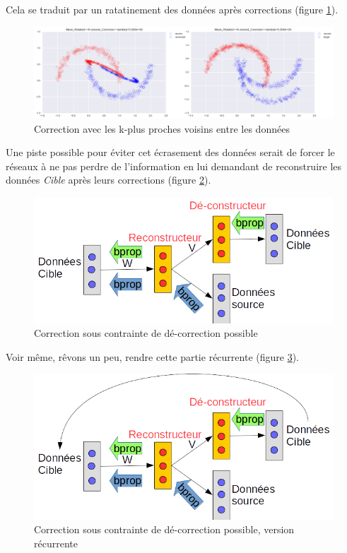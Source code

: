 Cela se traduit par un ratatinement des données après corrections (figure \ref{fig:exhaustive-pb}).

\begin{figure}[H] %
\centering
\includegraphics[width=\linewidth]{fig/21-04-2016/exhaustive-pb.png}
\caption{Correction avec les k-plus proches voisins entre les données}
\label{fig:exhaustive-pb}
\end{figure}

Une piste possible pour éviter cet écrasement des données serait de forcer le 
réseaux à ne pas perdre de l'information en lui demandant de reconstruire les
données \emph{Cible} après leurs corrections (figure \ref{fig:de-correcteur}).

\begin{figure}[H] %
\centering
\includegraphics[width=0.45\linewidth]{fig/21-04-2016/Re-De-constructeur.png}
\caption{Correction sous contrainte de dé-correction possible}
\label{fig:de-correcteur}
\end{figure}

Voir même, rêvons un peu, rendre cette partie récurrente (figure \ref{fig:recurrent-de-correcteur}).
\begin{figure}[H] %
\centering
\includegraphics[width=0.45\linewidth]{fig/21-04-2016/Recurrent-correcteur.png}
\caption{Correction sous contrainte de dé-correction possible, version récurrente}
\label{fig:recurrent-de-correcteur}
\end{figure}

